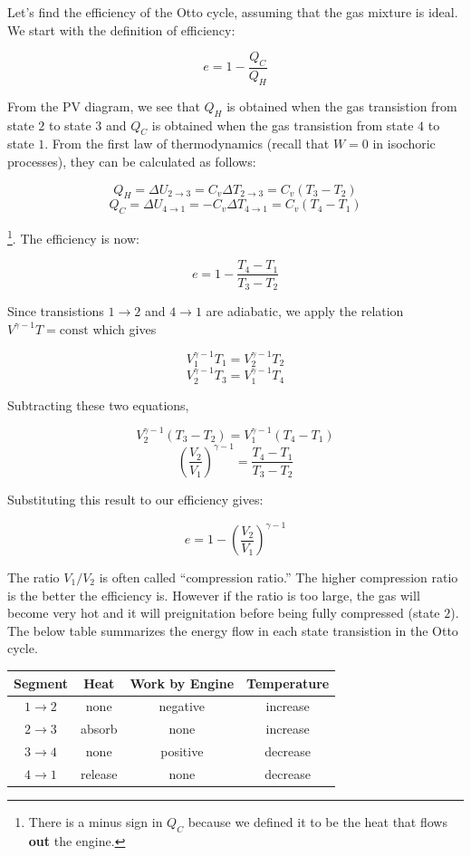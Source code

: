 \documentclass[12pt, a4paper]{article}
\begin{document}
Let's find the efficiency of the Otto cycle, assuming that the gas mixture is ideal. We start with the definition of efficiency:

\[e=1-\frac{Q_C}{Q_H}\]

From the PV diagram, we see that $Q_H$ is obtained when the gas transistion from state $2$ to state $3$ and $Q_C$ is obtained when the gas transistion from state $4$ to state $1$. From the first law of thermodynamics (recall that $W=0$ in isochoric processes), they can be calculated as follows:

\[Q_H=\Delta U_{2\to3}=C_v\Delta T_{2\to3}=C_v (T_3-T_2)\]
\[Q_C=\Delta U_{4\to1}=-C_v\Delta T_{4\to1}=C_v(T_4-T_1)\]

\footnote{There is a minus sign in $Q_C$ because we defined it to be the heat that flows \textbf{out} the engine.}. The efficiency is now:

\[e=1-\frac{T_4-T_1}{T_3-T_2}\]

Since transistions $1\to2$ and $4\to1$ are adiabatic, we apply the relation $V^{\gamma-1}T=\text{const}$ which gives

\[V_1^{\gamma-1}T_1=V_2^{\gamma-1}T_2\]
\[V_2^{\gamma-1}T_3=V_1^{\gamma-1}T_4\]

Subtracting these two equations,

\[V_2^{\gamma-1}(T_3-T_2)=V_1^{\gamma-1}(T_4-T_1)\]
\[\left( \frac{V_2}{V_1} \right)^{\gamma-1}=\frac{T_4-T_1}{T_3-T_2}\]

Substituting this result to our efficiency gives:

\[\boxed{e=1-\left( \frac{V_2}{V_1} \right)^{\gamma-1}}\]

The ratio $V_1/V_2$ is often called ``compression ratio.'' The higher compression ratio is the better the efficiency is. However if the ratio is too large, the gas will become very hot and it will preignitation before being fully compressed (state $2$). \\

The below table summarizes the energy flow in each state transistion in the Otto cycle.

\begin{center}
\begin{tabular}{c|c|c|c}
  Segment & Heat & Work \textbf{by} Engine & Temperature \\
  \hline
  $1\to2$ & none & negative & increase \\
  \hline
  $2\to3$ & absorb & none & increase \\
  \hline
  $3\to4$ & none & positive & decrease \\
  \hline
  $4\to1$ & release & none & decrease
\end{tabular}
\end{center}
\end{document}
